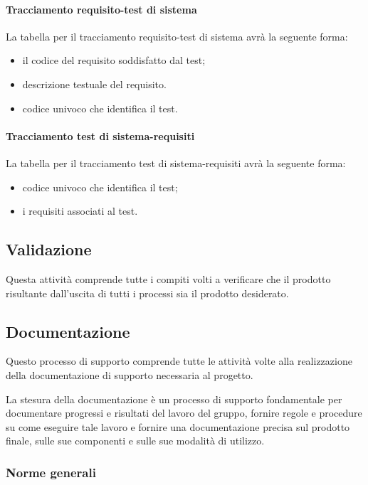 \paragraph{Tracciamento requisito-test di sistema}
La tabella per il tracciamento requisito-test di sistema avrà la seguente forma:
\begin{itemize}
\item {} il codice del requisito soddisfatto dal test;
\item {} descrizione testuale del requisito.
\item {}codice univoco che identifica il test.
\end{itemize}

\paragraph{Tracciamento test di sistema-requisiti}
La tabella per il tracciamento test di sistema-requisiti avrà la seguente forma:
\begin{itemize}
\item {}codice univoco che identifica il test;
\item {} i requisiti associati al test.
\end{itemize}

\subsection{Validazione}
Questa attività comprende tutte i compiti volti a verificare che il prodotto risultante dall'uscita di tutti i processi sia il prodotto desiderato.
 

\subsection{Documentazione}
Questo processo di supporto comprende tutte le attività volte alla realizzazione della documentazione di supporto necessaria al progetto.


La stesura della documentazione è un processo di supporto fondamentale per documentare progressi e risultati del lavoro del gruppo, fornire regole e procedure su come eseguire tale lavoro e fornire una documentazione precisa sul prodotto finale, sulle sue componenti e sulle sue modalità di utilizzo.
\subsubsection{Norme generali}


